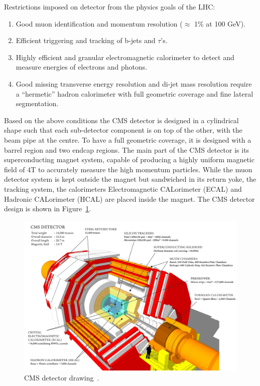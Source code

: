 Restrictions imposed on detector from the physics goals of the LHC:
\begin{enumerate}
	\item Good muon identification and momentum resolution ($\approx$ 1\% at 100 GeV).
	\item Efficient triggering and tracking of b-jets and $\tau$'s.
	\item Highly efficient and granular electromagnetic calorimeter to detect and measure energies of electrons and photons.
	\item Good missing transverse energy resolution and di-jet mass resolution require a ``hermetic'' hadron calorimeter with full geometric coverage and fine lateral segmentation.
\end{enumerate}

Based on the above conditions the CMS detector is designed in a cylindrical shape such that each sub-detector component is on top of the other, with the beam pipe at the centre. 
To have a full geometric coverage, it is designed with a barrel region and two endcap regions. The main part of the CMS detector is its superconducting magnet system, capable of producing a highly uniform magnetic field of 4T to accurately measure the high momentum particles. 
While the muon detector system is kept outside the magnet but sandwiched in its return yoke, the tracking system, the calorimeters Electromagnetic CALorimeter (ECAL) and Hadronic CALorimeter (HCAL) are placed inside the magnet. The CMS detector design is shown in Figure~\ref{fig:CMS-detector}.
\begin{figure}[!htbp]
	\centering
	\includegraphics[width=1.1\textwidth]{figures/LHC/cms_120918_03.png}
	\caption{CMS detector drawing~\cite{Taylor2011}.}
	\label{fig:CMS-detector}
\end{figure}

